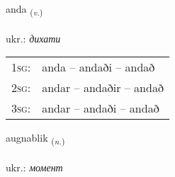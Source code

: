 \documentclass[frontgrid, backgrid]{flacards}\usepackage[]{graphicx}\usepackage[]{xcolor}
\begin{document}
\renewcommand{\blhead}{\vskip5pt {\small\bfseries\footnotesize Sagnorð | дієслово }}
\renewcommand{\bcfoot}{\vskip5pt \hspace{2pt}{\small\bfseries\footnotesize 3K}}


{anda \small{\textsubscript{(\textit{v.})}} \\[1ex] %
\textphonetic{[anta]} \\
ukr.: \emph{дихати} \\  [2ex]
\renewcommand*{\arraystretch}{0.8}
\begin{tabular}{p{1cm}l}
\textsc{1sg}: & anda -- andaði -- andað \\ 
\textsc{2sg}: & andar -- andaðir -- andað \\ 
\textsc{3sg}: & andar -- andaði -- andað \\ 
\end{tabular}
}

\renewcommand{\flhead}{\vskip5pt \fboxsep=0pt {\small\bfseries\footnotesize Nafnorð | іменник}}
\renewcommand{\fcfoot}{\vskip5pt \fboxsep=0pt \hspace{2pt}{\small\bfseries\footnotesize 3K}}

\renewcommand{\blhead}{\vskip5pt {\small\bfseries\footnotesize Nafnorð | іменник }}
\renewcommand{\bcfoot}{\vskip5pt \hspace{2pt}{\small\bfseries\footnotesize 3K}}


{augnablik \small{\textsubscript{(\textit{n.})}} \\[1ex] %
\textphonetic{[œiknaplɪk]} \\
ukr.: \emph{момент} \\  [2ex]
\renewcommand*{\arraystretch}{0.8}
}

\renewcommand{\flhead}{\vskip5pt \fboxsep=0pt {\small\bfseries\footnotesize Nafnorð | іменник}}
\renewcommand{\fcfoot}{\vskip5pt \fboxsep=0pt \hspace{2pt}{\small\bfseries\footnotesize 3K}}
\end{document}
